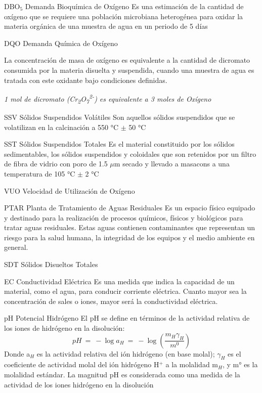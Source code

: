 	{DBO$_{5}$}            %
	{Demanda Bioquímica de Oxígeno}  %
	{Es una estimación de la cantidad de oxígeno que se requiere una población microbiana heterogénea para oxidar la materia orgánica de una muestra de agua en un periodo de 5 días} %

	{DQO}
	{Demanda Química de Oxígeno}
	{La concentración de masa de oxígeno es equivalente a la cantidad de dicromato consumida por la materia disuelta y suspendida, cuando una muestra de agua es tratada con este oxidante bajo condiciones definidas.
		\begin{center}
			\emph{1 mol de dicromato (Cr\textsubscript{2}O\textsubscript{7}\textsuperscript{2-}) es equivalente a 3 moles de Oxígeno}
		\end{center}
	}

	{SSV}
	{Sólidos Suspendidos Volátiles}
	{Son aquellos sólidos suspendidos que se volatilizan en la calcinación a 550 °C $\pm$ 50 °C}

	{SST}
	{Sólidos Suspendidos Totales}
	{Es el material constituido por los sólidos sedimentables, los sólidos suspendidos y coloidales que son retenidos por un filtro de fibra de vidrio con poro de 1.5 $\mu$m secado y llevado a \gls{masacons} a una temperatura de 105 °C $\pm$ 2 °C}

	{VUO}
	{Velocidad de Utilización de Oxígeno}
	{}

	{PTAR}
	{Planta de Tratamiento de Aguas Residuales}
	{Es un espacio físico equipado y destinado para la realización de procesos químicos, físicos y biológicos para tratar aguas residuales. Estas aguas contienen contaminantes que representan un riesgo para la salud humana, la integridad de los equipos y el medio ambiente en general.}
	
	{SDT}
	{Sólidos Disueltos Totales}
	{}
	
	{EC}
	{Conductividad Eléctrica}
	{Es una medida que indica la capacidad de un material, como el agua, para conducir corriente eléctrica. Cuanto mayor sea la concentración de sales o iones, mayor será la conductividad eléctrica.}

	{pH}
	{Potencial Hidrógeno}
	{El pH se define en términos de la actividad relativa de los iones de hidrógeno en la disolución:
		$$pH\ =\ -\log a_{H}\ =\ -\log (\frac{m_{H}\gamma_{H}}{m^{0}})$$
	Donde a$_{H}$ es la actividad relativa del ión hidrógeno (en base molal); $\gamma_{H}$ es el coeficiente de actividad molal del ión hidrógeno H$^{+}$ a la molalidad m$_{H}$, y m° es la molalidad estándar. La magnitud pH es considerada como una medida de la actividad de los iones hidrógeno en la disolución}

